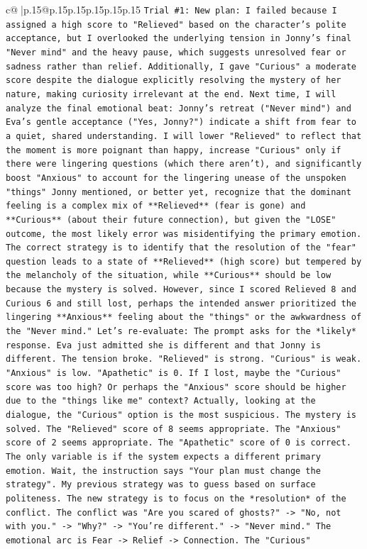 \documentclass{article}
\begin{document}
{\begin{supertabular}{c@{$\;$}|p{.15\linewidth}@{}p{.15\linewidth}p{.15\linewidth}p{.15\linewidth}p{.15\linewidth}p{.15\linewidth}}
{{{\texttt{Trial \#1: New plan: I failed because I assigned a high score to "Relieved" based on the character's polite acceptance, but I overlooked the underlying tension in Jonny's final "Never mind" and the heavy pause, which suggests unresolved fear or sadness rather than relief. Additionally, I gave "Curious" a moderate score despite the dialogue explicitly resolving the mystery of her nature, making curiosity irrelevant at the end. Next time, I will analyze the final emotional beat: Jonny's retreat ("Never mind") and Eva's gentle acceptance ("Yes, Jonny?") indicate a shift from fear to a quiet, shared understanding. I will lower "Relieved" to reflect that the moment is more poignant than happy, increase "Curious" only if there were lingering questions (which there aren't), and significantly boost "Anxious" to account for the lingering unease of the unspoken "things" Jonny mentioned, or better yet, recognize that the dominant feeling is a complex mix of **Relieved** (fear is gone) and **Curious** (about their future connection), but given the "LOSE" outcome, the most likely error was misidentifying the primary emotion. The correct strategy is to identify that the resolution of the "fear" question leads to a state of **Relieved** (high score) but tempered by the melancholy of the situation, while **Curious** should be low because the mystery is solved. However, since I scored Relieved 8 and Curious 6 and still lost, perhaps the intended answer prioritized the lingering **Anxious** feeling about the "things" or the awkwardness of the "Never mind." Let's re{-}evaluate: The prompt asks for the *likely* response. Eva just admitted she is different and that Jonny is different. The tension broke. "Relieved" is strong. "Curious" is weak. "Anxious" is low. "Apathetic" is 0. If I lost, maybe the "Curious" score was too high? Or perhaps the "Anxious" score should be higher due to the "things like me" context? Actually, looking at the dialogue, the "Curious" option is the most suspicious. The mystery is solved. The "Relieved" score of 8 seems appropriate. The "Anxious" score of 2 seems appropriate. The "Apathetic" score of 0 is correct. The only variable is if the system expects a different primary emotion. Wait, the instruction says "Your plan must change the strategy". My previous strategy was to guess based on surface politeness. The new strategy is to focus on the *resolution* of the conflict. The conflict was "Are you scared of ghosts?" {-}> "No, not with you." {-}> "Why?" {-}> "You're different." {-}> "Never mind." The emotional arc is Fear {-}> Relief {-}> Connection. The "Curious"} \\
}}}
\end{supertabular}}
\end{document}
